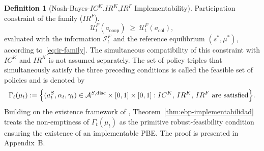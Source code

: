 \documentclass[review,authoryear,12pt]{elsarticle}
\theoremstyle{plain}
\theoremstyle{definition}
\newtheorem{definition}[theorem]{Definition}
\newcommand{\1}{\mathbf{1}}
\begin{document}
\begin{definition}[Nash-Bayes-$IC^K$,$IR^K$,$IR^F$ Implementability]
\smallskip
\noindent Participation constraint of the family \textup{(}$IR^F$\textup{)}.
\[
\mathcal{U}^F_t(a_{\mathrm{coop}})\;\ge\;\mathcal{U}^F_t(a_{\mathrm{col}}),
\]
evaluated with the information $\mathcal{I}_t^F$ and the reference equilibrium $(s^\ast,\mu^\ast)$, according to~\eqref{eq:ir-family}.
The simultaneous compatibility of this constraint with $IC^K$ and $IR^K$ is not assumed separately. The set of policy triples that simultaneously satisfy the three preceding conditions is called the feasible set of policies and is denoted by
\begin{equation}
\label{eq:gamma-factible}
\Gamma_t(\mu_t)
:=\Bigl\{(a_t^S,\alpha_t,\gamma_t)\in
\mathcal{A}^{S,\mathrm{disc}}\times[0,1]\times[0,1] :
IC^K,\,IR^K,\,IR^F
\text{ are satisfied}\Bigr\}.
\end{equation}
Building on the existence framework of \citet{KadanRenySwinkels2017}, Theorem~\ref{thm:ebp-implementabilidad} treats the non-emptiness of $\Gamma_t(\mu_t)$ as the primitive robust-feasibility condition ensuring the existence of an implementable PBE. The proof is presented in Appendix~B.
\end{definition}
\end{document}
